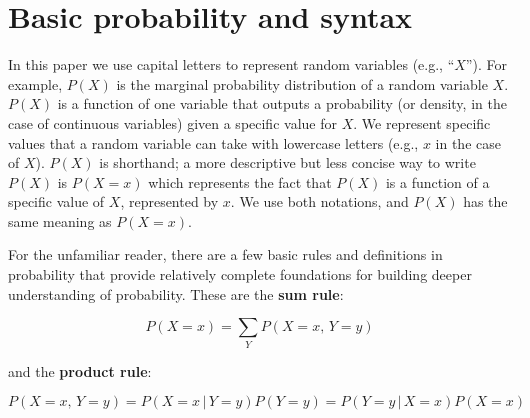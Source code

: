 \documentclass[12pt]{article}
\begin{document}


\appendix
\section{Basic probability and syntax}
\label{prob-theory}

In this paper we use capital letters to represent random variables
(e.g., ``$X$''). For example, $P(X)$ is the marginal probability distribution
of a random variable $X$. $P(X)$ is a function of one variable that
outputs a probability (or density, in the case of continuous
variables) given a specific value for $X$. We represent specific
values that a random variable can take with lowercase letters (e.g.,
$x$ in the case of $X$). $P(X)$ is shorthand; a more descriptive but
less concise way to write $P(X)$ is $P(X=x)$ which represents the fact
that $P(X)$ is a function of a specific value of $X$, represented by
$x$. We use both notations, and $P(X)$ has the same meaning as
$P(X=x)$.

For the unfamiliar reader, there are a few basic rules and definitions
in probability that provide relatively complete foundations for
building deeper understanding of probability. These are the
\textbf{sum rule}:

\begin{equation} P(X=x) = \sum_Y P(X=x,\, Y=y)
  \label{eq:sum}
\end{equation}

and the \textbf{product rule}:

\begin{equation} P(X=x, \, Y=y) = P(X = x \, | \, Y=y ) P(Y=y) = P(Y =
  y \, | \, X=x ) P(X=x)
  \label{eq:product}
\end{equation}
\end{document}
